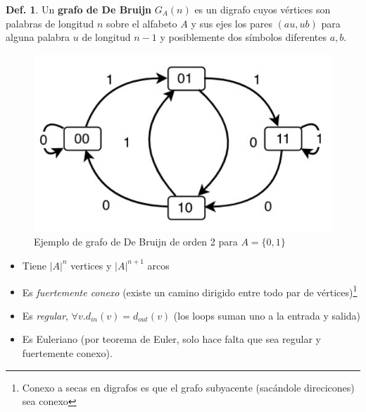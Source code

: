 \documentclass{report}
\theoremstyle{definition} %
\newtheorem{definition}{Def.}
\begin{document}
\begin{definition}
    Un \textbf{grafo de De Bruijn} $G_A(n)$ es un digrafo cuyos vértices son
    palabras de longitud $n$ sobre el alfabeto $A$ y sus ejes los pares $(au,
    ub)$ para alguna palabra $u$ de longitud $n - 1$ y posiblemente dos símbolos
    diferentes $a, b$.

    \begin{figure}[H]
        \centering
        \includegraphics[scale=0.3]{img/2_de_brujin_01.png}
        \caption{Ejemplo de grafo de De Bruijn de orden 2 para $A = \{0, 1\}$}
    \end{figure}
    
    \begin{itemize}
        \item Tiene $|A|^n$ vertices y $|A|^{n+1}$ arcos
        \item Es \textit{fuertemente conexo} (existe un camino dirigido entre
        todo par de vértices)\footnote{Conexo a secas en digrafos es que el grafo
        subyacente (sacándole direcicones) sea conexo}
        \item Es \textit{regular}, $\forall v. d_{in}(v) = d_{out}(v)$ (los
        loops suman uno a la entrada y salida)
        \item Es Euleriano (por teorema de Euler, solo hace falta que sea
        regular y fuertemente conexo).
    \end{itemize}
\end{definition}
\end{document}
